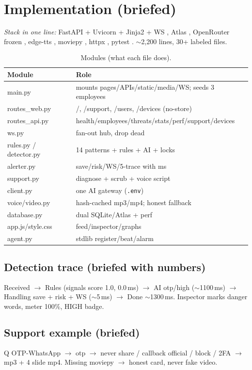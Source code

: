 \documentclass[11pt,a4paper]{article}
\begin{document}
\section{Implementation (briefed)}
\noindent\textit{Stack in one line:} FastAPI + Uvicorn + Jinja2 + WS \cite{FastAPI24}, Atlas \cite{Mongo24}, OpenRouter frozen \cite{Ji25}, edge-tts \cite{EdgeTTS24}, moviepy \cite{Moviepy24}, httpx \cite{HTTPX24}, pytest \cite{Pytest24}. $\sim$2,200 lines, 30+ labeled files.
\begin{table}[h]\centering\caption{Modules (what each file does).}\begin{tabular}{@{}lp{9cm}@{}} \toprule Module & Role\\\midrule
main.py & mounts pages/APIs/static/media/WS; seeds 3 employees\\
routes\_web.py & /, /support, /users, /devices (no-store)\\
routes\_api.py & health/employees/threats/stats/perf/support/devices\\
ws.py & fan-out hub, drop dead\\
rules.py / detector.py & 14 patterns + rules + AI + locks\\
alerter.py & save/risk/WS/5-trace with ms\\
support.py & diagnose + scrub + voice script\\
client.py & one AI gateway (\texttt{.env})\\
voice/video.py & hash-cached mp3/mp4; honest fallback\\
database.py & dual SQLite/Atlas + perf\\
app.js/style.css & feed/inspector/graphs\\
agent.py & stdlib register/beat/alarm\\\bottomrule\end{tabular}\end{table}

\subsection{Detection trace (briefed with numbers)}
Received $\rightarrow$ Rules (signals score 1.0, 0.0\,ms) $\rightarrow$ AI otp/high ($\sim$1100\,ms) $\rightarrow$ Handling save + risk + WS ($\sim$5\,ms) $\rightarrow$ Done $\sim$1300\,ms. Inspector marks danger words, meter 100\%, HIGH badge.

\subsection{Support example (briefed)}
Q OTP-WhatsApp $\rightarrow$ otp $\rightarrow$ never share / callback official / block / 2FA $\rightarrow$ mp3 + 4 slide mp4. Missing moviepy $\rightarrow$ honest card, never fake video.
\end{document}
